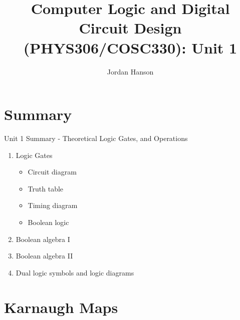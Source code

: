 \documentclass{beamer}
\title{Computer Logic and Digital Circuit Design (PHYS306/COSC330): Unit 1}
\author{Jordan Hanson}
\institute{Whittier College Department of Physics and Astronomy}
\begin{document}
\maketitle

\section{Summary}

\begin{frame}{Unit 1 Summary - Theoretical Logic Gates, and Operations}
\begin{enumerate}
\item Logic Gates
\begin{itemize}
\item Circuit diagram
\item Truth table
\item Timing diagram
\item Boolean logic
\end{itemize}
\item \alert{Boolean algebra I}
\item \alert{Boolean algebra II}
\item Dual logic symbols and logic diagrams
\end{enumerate}
\end{frame}

\section{Karnaugh Maps}
\end{document}
